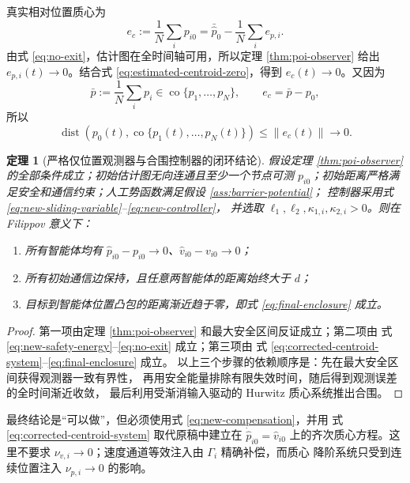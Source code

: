 \documentclass[UTF8,a4paper,12pt]{ctexart}
\newtheorem{theorem}{定理}
\newcommand{\norm}[1]{\left\lVert #1\right\rVert}
\begin{document}
真实相对位置质心为
\begin{equation}
 e_c:=\frac1N\sum_i p_{i0}
 =\bar{\hat p}_0-\frac1N\sum_i e_{p,i}.
\end{equation}
由式 \eqref{eq:no-exit}，估计图在全时间轴可用，所以定理
\ref{thm:poi-observer} 给出
$e_{p,i}(t)\to0$。结合式 \eqref{eq:estimated-centroid-zero}，得到
$e_c(t)\to0$。又因为
\begin{equation}
 \bar p:=\frac1N\sum_i p_i\in\operatorname{co}\{p_1,\ldots,p_N\},
 \qquad e_c=\bar p-p_0,
\end{equation}
所以
\begin{equation}
 \operatorname{dist}\!\left(p_0(t),
 \operatorname{co}\{p_1(t),\ldots,p_N(t)\}\right)
 \le\norm{e_c(t)}\to0.
 \label{eq:final-enclosure}
\end{equation}

\begin{theorem}[严格仅位置观测器与合围控制器的闭环结论]
假设定理 \ref{thm:poi-observer} 的全部条件成立；初始估计图无向连通且至少一个节点可测
$p_{i0}$；初始距离严格满足安全和通信约束；人工势函数满足假设
\ref{ass:barrier-potential}；
控制器采用式 \eqref{eq:new-sliding-variable}--\eqref{eq:new-controller}，
并选取 $\ell_1,\ell_2,\kappa_{1,i},\kappa_{2,i}>0$。则在 Filippov
意义下：
\begin{enumerate}
 \item 所有智能体均有
 $\hat p_{i0}-p_{i0}\to0$、$\hat v_{i0}-v_{i0}\to0$；
 \item 所有初始通信边保持，且任意两智能体的距离始终大于 $d$；
 \item 目标到智能体位置凸包的距离渐近趋于零，即式
 \eqref{eq:final-enclosure} 成立。
\end{enumerate}
\end{theorem}

\begin{proof}
第一项由定理 \ref{thm:poi-observer} 和最大安全区间反证成立；第二项由
式 \eqref{eq:new-safety-energy}--\eqref{eq:no-exit} 成立；第三项由
式 \eqref{eq:corrected-centroid-system}--\eqref{eq:final-enclosure} 成立。
以上三个步骤的依赖顺序是：先在最大安全区间获得观测器一致有界性，
再用安全能量排除有限失效时间，随后得到观测误差的全时间渐近收敛，
最后利用受渐消输入驱动的 Hurwitz 质心系统推出合围。
\end{proof}

\begin{auditbox}
最终结论是``可以做''，但必须使用式 \eqref{eq:new-compensation}，并用
式 \eqref{eq:corrected-centroid-system} 取代原稿中建立在
$\dot{\hat p}_{i0}=\hat v_{i0}$ 上的齐次质心方程。这里不要求
$\nu_{v,i}\to0$；速度通道等效注入由 $\Gamma_i$ 精确补偿，而质心
降阶系统只受到连续位置注入 $\nu_{p,i}\to0$ 的影响。
\end{auditbox}
\end{document}
